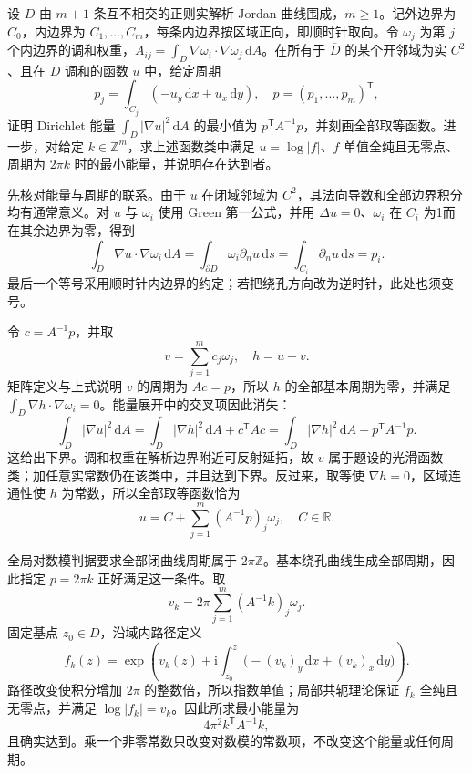 \begin{exercise}[指定周期所需的最小能量]\label{b3:ex:17-draft-07}
设 \(D\) 由 \(m+1\) 条互不相交的正则实解析 Jordan 曲线围成，\(m\ge1\)。记外边界为 \(C_0\)，内边界为 \(C_1,\ldots,C_m\)，每条内边界按区域正向，即顺时针取向。令 \(\omega_j\) 为第 \(j\) 个内边界的调和权重，\(A_{ij}=\int_D\nabla\omega_i\cdot\nabla\omega_j\,\mathrm dA\)。在所有于 \(\overline D\) 的某个开邻域为实 \(C^2\)、且在 \(D\) 调和的函数 \(u\) 中，给定周期
\[
 p_j=\int_{C_j}(-u_y\,\mathrm dx+u_x\,\mathrm dy),\quad
 p=(p_1,\ldots,p_m)^{\mathsf T},
\]
证明 Dirichlet 能量 \(\int_D|\nabla u|^2\,\mathrm dA\) 的最小值为 \(p^{\mathsf T}A^{-1}p\)，并刻画全部取等函数。进一步，对给定 \(k\in\mathbb Z^m\)，求上述函数类中满足 \(u=\log|f|\)、\(f\) 单值全纯且无零点、周期为 \(2\pi k\) 时的最小能量，并说明存在达到者。
\end{exercise}
\begin{solution}
先核对能量与周期的联系。由于 \(u\) 在闭域邻域为 \(C^2\)，其法向导数和全部边界积分均有通常意义。对 \(u\) 与 \(\omega_i\) 使用 Green 第一公式，并用 \(\Delta u=0\)、\(\omega_i\) 在 \(C_i\) 为1而在其余边界为零，得到
\[
 \int_D\nabla u\cdot\nabla\omega_i\,\mathrm dA
 =\int_{\partial D}\omega_i\partial_nu\,\mathrm ds
 =\int_{C_i}\partial_nu\,\mathrm ds=p_i.
\]
最后一个等号采用顺时针内边界的约定；若把绕孔方向改为逆时针，此处也须变号。

令 \(c=A^{-1}p\)，并取
\[
 v=\sum_{j=1}^mc_j\omega_j,\quad h=u-v.
\]
矩阵定义与上式说明 \(v\) 的周期为 \(Ac=p\)，所以 \(h\) 的全部基本周期为零，并满足
\(\int_D\nabla h\cdot\nabla\omega_i=0\)。能量展开中的交叉项因此消失：
\[
 \int_D|\nabla u|^2\,\mathrm dA
 =\int_D|\nabla h|^2\,\mathrm dA+c^{\mathsf T}Ac
 =\int_D|\nabla h|^2\,\mathrm dA+p^{\mathsf T}A^{-1}p.
\]
这给出下界。调和权重在解析边界附近可反射延拓，故 \(v\) 属于题设的光滑函数类；加任意实常数仍在该类中，并且达到下界。反过来，取等使 \(\nabla h=0\)，区域连通性使 \(h\) 为常数，所以全部取等函数恰为
\[
 u=C+\sum_{j=1}^m(A^{-1}p)_j\omega_j,\quad C\in\mathbb R.
\]

全局对数模判据要求全部闭曲线周期属于 \(2\pi\mathbb Z\)。基本绕孔曲线生成全部周期，因此指定 \(p=2\pi k\) 正好满足这一条件。取
\[
 v_k=2\pi\sum_{j=1}^m(A^{-1}k)_j\omega_j.
\]
固定基点 \(z_0\in D\)，沿域内路径定义
\[
 f_k(z)=\exp\left(v_k(z)+\mathrm i
        \int_{z_0}^z\bigl(-(v_k)_y\,\mathrm dx+(v_k)_x\,\mathrm dy\bigr)\right).
\]
路径改变使积分增加 \(2\pi\) 的整数倍，所以指数单值；局部共轭理论保证 \(f_k\) 全纯且无零点，并满足 \(\log|f_k|=v_k\)。因此所求最小能量为
\[
 4\pi^2k^{\mathsf T}A^{-1}k,
\]
且确实达到。乘一个非零常数只改变对数模的常数项，不改变这个能量或任何周期。
\end{solution}

